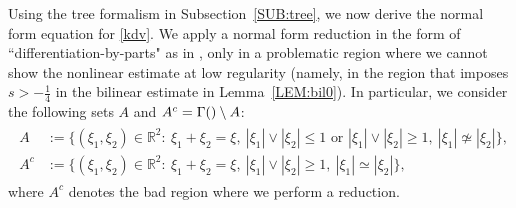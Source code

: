 \documentclass[%
11pt,  reqno]{amsart}
\makeatletter
\newcommand{\5}{\textup{V}}
\theoremstyle{remark}
\newcommand{\R}{\mathbb{R}}
\newcommand{\G}{\Gamma}
\def\<#1>{\csname MH@symb@#1\endcsname}
\numberwithin{equation}{section}
\numberwithin{theorem}{section}
\makeatother
\begin{document}
Using the tree formalism in Subsection~\ref{SUB:tree}, we now derive the normal form equation for \eqref{kdv}.
We apply a normal form reduction in the form of ``differentiation-by-parts" as in \cite{bit}, only in a problematic region where we cannot show the nonlinear estimate at low regularity
(namely, in the region that imposes $s>-\frac14$ in the bilinear estimate in Lemma~\ref{LEM:bil0}).
In particular, we consider the following sets $A$ and $A^c = \G({\<1>}) \setminus A$: 
\begin{align}
\label{A}
\begin{split} 
A & := \big\{ (\xi_{1}, \xi_{2}) \in \R^2: \ \xi_{1}+ \xi_{2} = \xi, \  |\xi_{1}| \lor  |\xi_{2}| \le 1 \text{ or } |\xi_{1}| \lor  |\xi_{2}| \ge 1,  \ |\xi_{1}| \not\simeq |\xi_{2}| \big\}, \\
A^c & := \big\{ (\xi_{1}, \xi_2) \in \R^2: \ \xi_{1}+ \xi_{2} = \xi,  \ |\xi_{1}| \lor |\xi_{2}| \ge 1 , \ |\xi_{1}| \simeq |\xi_{2}| \big\}, 
\end{split}
\end{align}
where $A^c$ denotes the bad region where we perform a reduction. 
\end{document}
